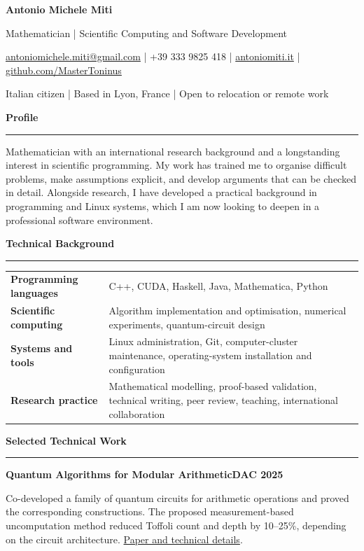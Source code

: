 \documentclass[11pt,a4paper]{article}
\newcommand{\cvsection}[1]{%
  \vspace{0.85em}%
  {\large\bfseries\color{accent} #1}\par
  \vspace{0.18em}\hrule\vspace{0.45em}%
}
\newcommand{\project}[3]{%
  \textbf{#1}\hfill\textbf{#2}\par
  #3\par\vspace{0.7em}%
}
\begin{document}
{\Huge\bfseries Antonio Michele Miti}\par
\vspace{0.15em}
{\large\color{accent} Mathematician | Scientific Computing and Software Development}\par
\vspace{0.4em}
\small
\href{mailto:antoniomichele.miti@gmail.com}{antoniomichele.miti@gmail.com}
\enspace | \enspace +39 333 9825 418
\enspace | \enspace \href{https://www.antoniomiti.it/}{antoniomiti.it}
\enspace | \enspace \href{https://github.com/MasterToninus}{github.com/MasterToninus}\par
Italian citizen \enspace | \enspace Based in Lyon, France \enspace | \enspace Open to relocation or remote work

\cvsection{Profile}

Mathematician with an international research background and a longstanding interest in scientific programming. My work has trained me to organise difficult problems, make assumptions explicit, and develop arguments that can be checked in detail. Alongside research, I have developed a practical background in programming and Linux systems, which I am now looking to deepen in a professional software environment.

\cvsection{Technical Background}

\begin{tabularx}{\textwidth}{@{}>{\bfseries}p{4.6cm}>{\raggedright\arraybackslash}X@{}}
Programming languages & C++, CUDA, Haskell, Java, Mathematica, Python \\
Scientific computing & Algorithm implementation and optimisation, numerical experiments, quantum-circuit design \\
Systems and tools & Linux administration, Git, computer-cluster maintenance, operating-system installation and configuration \\
Research practice & Mathematical modelling, proof-based validation, technical writing, peer review, teaching, international collaboration
\end{tabularx}

\cvsection{Selected Technical Work}

\project{Quantum Algorithms for Modular Arithmetic}{DAC 2025}{
Co-developed a family of quantum circuits for arithmetic operations and proved the corresponding constructions. The proposed measurement-based uncomputation method reduced Toffoli count and depth by 10--25\%, depending on the circuit architecture. \href{https://arxiv.org/abs/2407.20167}{Paper and technical details}.}
\end{document}
